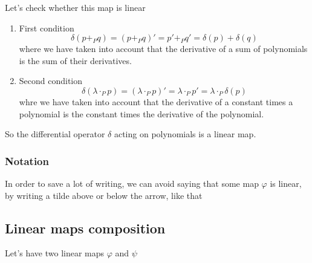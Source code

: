 Let's check whether this map is linear
\begin{enumerate}
\item First condition
  \[
    \delta(p +_{\scriptscriptstyle P} q)
    = (p +_{\scriptscriptstyle P} q)'
    = p' +_{\scriptscriptstyle P} q'
    = \delta(p) + \delta(q)
  \]
  where we have taken into account that the derivative of a sum of polynomials is
  the sum of their derivatives.
\item Second condition
  \[
    \delta(\lambda \cdot_{\scriptscriptstyle P} p)
    = (\lambda \cdot_{\scriptscriptstyle P} p)'
    = \lambda \cdot_{\scriptscriptstyle P} p'
    = \lambda \cdot_{\scriptscriptstyle P} \delta(p)
  \]
  whre we have taken into account that the derivative of a constant times a polynomial
  is the constant times the derivative of the polynomial.
\end{enumerate}
So the differential operator $\delta$ acting on polynomials is a linear map.

\subsubsection{Notation}
In order to save a lot of writing, we can avoid saying that some map $\varphi$ is linear,
by writing a tilde above or below the arrow, like that
\vspace{-1ex}
\begin{center}
\end{center}



\subsection{Linear maps composition}
Let's have two linear maps $\varphi$ and $\psi$
\begin{center}
\end{center}

